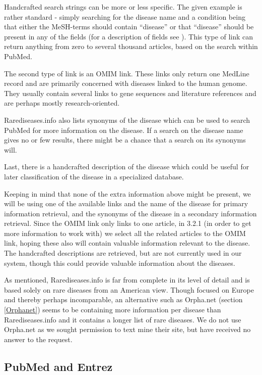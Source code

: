 Handcrafted search strings can be more or less specific. The given
example is rather standard - simply searching for the disease name and
a condition being that either the MeSH-terms should contain ``disease''
or that ``disease'' should be present in any of the fields (for a
description of fields see
\cite{PubMedHelpSearchFieldDescriptionsTags}). This type of link can
return anything from zero to several thousand articles, based on the
search within PubMed.

The second type of link is an OMIM link. These links only return one
MedLine record and are primarily concerned with diseases linked to the
human genome. They usually contain several links to gene sequences and
literature references and are perhaps mostly research-oriented.

Rarediseases.info also lists synonyms of the disease which can be used
to search PubMed for more information on the disease. If a search on
the disease name gives no or few results, there might be a chance
that a search on its synonyms will.

Last, there is a handcrafted description of the disease which could be
useful for later classification of the disease in a specialized
database.

Keeping in mind that none of the extra information above might be
present, we will be using one of the available links and the name of
the disease for primary information retrieval, and the synonyms of the
disease in a secondary information retrieval. Since the OMIM link only
links to one article, in 3.2.1  (in order to get more
information to work with) we select all the related articles to the
OMIM link, hoping these also will contain valuable information
relevant to the disease. The handcrafted descriptions are retrieved,
but are not currently used in our system, though this could provide
valuable information about the diseases. 

As mentioned, Rarediseases.info is far from complete in its level of
detail and is based solely on rare diseases from an American
view. Though focused on Europe and thereby perhaps incomparable, an
alternative such as Orpha.net (section \ref{Orphanet}) seems to be
containing more information per disease than Rarediseases.info and it
contains a longer list of rare diseases. We do not use Orpha.net
as we sought permission to text mine their site, but have
received no answer to the request.

\subsection{PubMed and Entrez\label{PubmedEntrez}}

